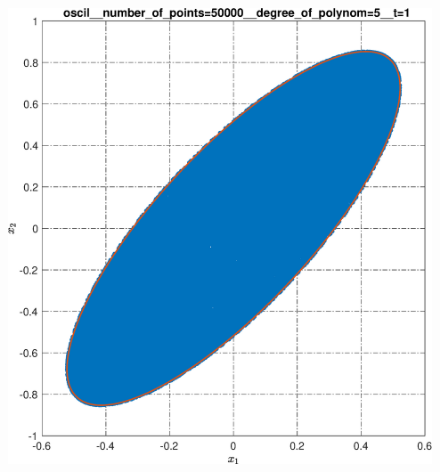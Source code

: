 \documentclass[../main.tex]{subfiles}
\begin{document}
\begin{figure}[ht!]
\begin{minipage}[b]{.3\linewidth}
 		\label{fig:ap:oscilN5104k1T2pi}
 	\end{minipage} 
 	\vfill
 	\hspace{-2.5ex}
 	\begin{minipage}[b]{.3\linewidth} 
 		\small
 		\centering 
 		\includegraphics[width=\linewidth]{images/oscil__number_of_points=50000__degree_of_polynom=5__t=1.eps}
 	\end{minipage}
 	\hfill
 	\begin{minipage}[b]{.3\linewidth} 
 		\small
 		\centering

\end{minipage}
\end{figure}
\end{document}
